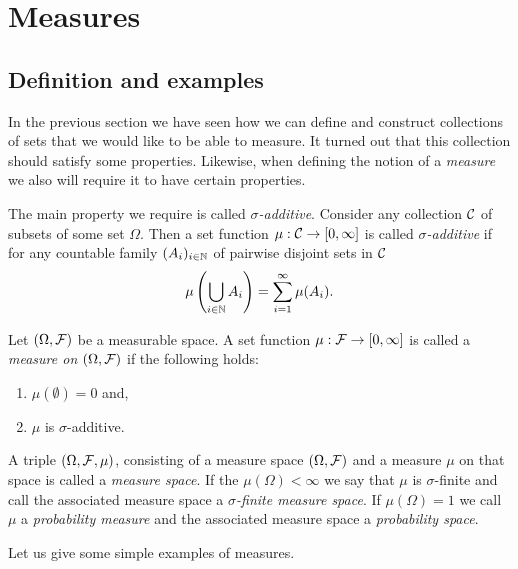 \section{Measures}

\subsection{Definition and examples}
In the previous section we have seen how we can define and construct collections of sets that we would like to be able to measure. It turned out that this collection should satisfy some properties. Likewise, when defining the notion of a \emph{measure} we also will require it to have certain properties.

The main property we require is called \emph{$\sigma$-additive}. Consider any collection $\mathcal C$ of subsets of some set $\Omega$. Then a set function $\mu : \mathcal C \to [0,\infty]$ is called \emph{$\sigma$-additive} if for any countable family $(A_i)_{i \in \mathbb N}$ of pairwise disjoint sets in $\mathcal C$
\[
	\mu\left(\bigcup_{i \in \mathbb N} A_i\right) = \sum_{i = 1}^\infty \mu(A_i).
\]

\begin{definition}[Measure]\label{def:measure}
Let $(\Omega, \mathcal F)$ be a measurable space. A set function $\mu : \mathcal F \to [0,\infty]$ is called a \emph{measure on $(\Omega, \mathcal F)$} if the following holds:
\begin{enumerate}
\item $\mu(\emptyset) = 0$ and,
\item $\mu$ is $\sigma$-additive.
\end{enumerate}
\end{definition}

A triple $(\Omega, \mathcal F, \mu)$, consisting of a measure space $(\Omega, \mathcal F)$ and a measure $\mu$ on that space is called a \emph{measure space}. If the $\mu(\Omega) < \infty$ we say that $\mu$ is $\sigma$-finite and call the associated measure space a \emph{$\sigma$-finite measure space}. If $\mu(\Omega) = 1$ we call $\mu$ a \emph{probability measure} and the associated measure space a \emph{probability space}.

Let us give some simple examples of measures.

